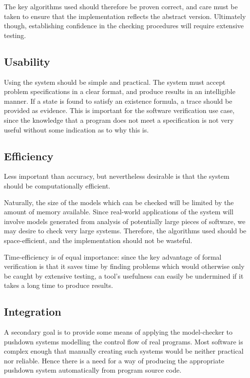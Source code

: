 \documentclass[11pt]{article}
\theoremstyle{definition}
\begin{document}
The key algorithms used should therefore be proven correct, and care must be
taken to ensure that the implementation reflects the abstract version.
Ultimately though, establishing confidence in the checking procedures will
require extensive testing.

\subsection{Usability}

Using the system should be simple and practical.  The system must accept
problem specifications in a clear format, and produce results in an
intelligible manner.  If a state is found to satisfy an existence formula, a
trace should be provided as evidence.  This is important for the software
verification use case, since the knowledge that a program does not meet a
specification is not very useful without some indication as to why this is.

\subsection{Efficiency}

Less important than accuracy, but nevertheless desirable is that the system
should be computationally efficient. 

Naturally, the size of the models which can be checked will be limited by the
amount of memory available. Since real-world applications of the system will
involve models generated from analysis of potentially large pieces of software,
we may desire to check very large systems. Therefore, the algorithms used
should be space-efficient, and the implementation should not be wasteful.

Time-efficiency is of equal importance: since the key advantage of formal
verification is that it saves time by finding problems which would otherwise
only be caught by extensive testing, a tool's usefulness can easily be
undermined if it takes a long time to produce results.

\subsection{Integration}
A secondary goal is to provide some means of applying the model-checker to
pushdown systems modelling the control flow of real programs. Most software is
complex enough that manually creating such systems would be neither practical
nor reliable. Hence there is a need for a way of producing the appropriate
pushdown system automatically from program source code.
\end{document}
